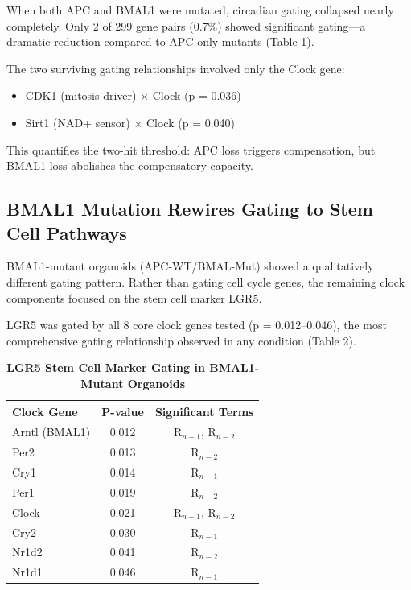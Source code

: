 \documentclass[11pt,letterpaper]{article}
\begin{document}
When both APC and BMAL1 were mutated, circadian gating collapsed nearly completely. Only 2 of 299 gene pairs (0.7\%) showed significant gating---a dramatic reduction compared to APC-only mutants (Table 1).

The two surviving gating relationships involved only the Clock gene:
\begin{itemize}
    \item CDK1 (mitosis driver) $\times$ Clock (p = 0.036)
    \item Sirt1 (NAD+ sensor) $\times$ Clock (p = 0.040)
\end{itemize}

This quantifies the two-hit threshold: APC loss triggers compensation, but BMAL1 loss abolishes the compensatory capacity.

\subsection{BMAL1 Mutation Rewires Gating to Stem Cell Pathways}

BMAL1-mutant organoids (APC-WT/BMAL-Mut) showed a qualitatively different gating pattern. Rather than gating cell cycle genes, the remaining clock components focused on the stem cell marker LGR5.

LGR5 was gated by all 8 core clock genes tested (p = 0.012--0.046), the most comprehensive gating relationship observed in any condition (Table 2).

\begin{table}[H]
\centering
\caption{\textbf{LGR5 Stem Cell Marker Gating in BMAL1-Mutant Organoids}}
\begin{tabular}{lcc}
\toprule
\textbf{Clock Gene} & \textbf{P-value} & \textbf{Significant Terms} \\
\midrule
Arntl (BMAL1) & 0.012 & R$_{n-1}$, R$_{n-2}$ \\
Per2 & 0.013 & R$_{n-2}$ \\
Cry1 & 0.014 & R$_{n-1}$ \\
Per1 & 0.019 & R$_{n-2}$ \\
Clock & 0.021 & R$_{n-1}$, R$_{n-2}$ \\
Cry2 & 0.030 & R$_{n-1}$ \\
Nr1d2 & 0.041 & R$_{n-2}$ \\
Nr1d1 & 0.046 & R$_{n-1}$ \\
\bottomrule
\end{tabular}
\label{tab:lgr5}
\end{table}
\end{document}
